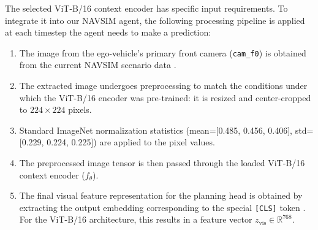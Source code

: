 \documentclass{article}
\begin{document}
The selected ViT-B/16 context encoder has specific input requirements. To integrate it into our NAVSIM agent, the following processing pipeline is applied at each timestep the agent needs to make a prediction:
\begin{enumerate}
    \item The image from the ego-vehicle's primary front camera (\texttt{cam\_f0}) is obtained from the current NAVSIM scenario data \cite{dauner2024navsim, OpenScene2023}.
    \item The extracted image undergoes preprocessing to match the conditions under which the ViT-B/16 encoder was pre-trained: it is resized and center-cropped to $224 \times 224$ pixels.
    \item Standard ImageNet normalization statistics (mean=[0.485, 0.456, 0.406], std=[0.229, 0.224, 0.225]) are applied to the pixel values.
    \item The preprocessed image tensor is then passed through the loaded ViT-B/16 context encoder ($f_\theta$).
    \item The final visual feature representation for the planning head is obtained by extracting the output embedding corresponding to the special \texttt{[CLS]} token \cite{dosovitskiy2020vit}. For the ViT-B/16 architecture, this results in a feature vector $z_{\text{vis}} \in \mathbb{R}^{768}$.
\end{enumerate}
\end{document}
